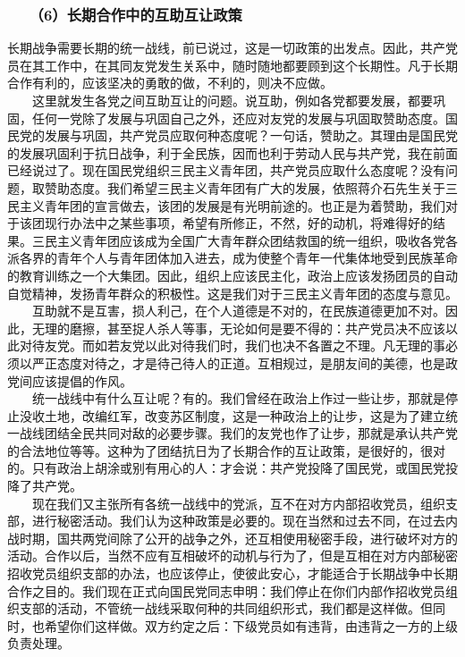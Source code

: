 \documentclass[cn,11pt,chinese]{elegantbook}
\def\myformat#1{\hfil\hfil #1}
\begin{document}
\subsubsection*{\myformat{　　（6）长期合作中的互助互让政策}}
长期战争需要长期的统一战线，前已说过，这是一切政策的出发点。因此，共产党员在其工作中，在其同友党发生关系中，随时随地都要顾到这个长期性。凡于长期合作有利的，应该坚决的勇敢的做，不利的，则决不应做。\\
　　这里就发生各党之间互助互让的问题。说互助，例如各党都要发展，都要巩固，任何一党除了发展与巩固自己之外，还应对友党的发展与巩固取赞助态度。国民党的发展与巩固，共产党员应取何种态度呢？一句话，赞助之。其理由是国民党的发展巩固利于抗日战争，利于全民族，因而也利于劳动人民与共产党，我在前面已经说过了。现在国民党组织三民主义青年团，共产党员应取什么态度呢？没有问题，取赞助态度。我们希望三民主义青年团有广大的发展，依照蒋介石先生关于三民主义青年团的宣言做去，该团的发展是有光明前途的。也正是为着赞助，我们对于该团现行办法中之某些事项，希望有所修正，不然，好的动机，将难得好的结果。三民主义青年团应该成为全国广大青年群众团结救国的统一组织，吸收各党各派各界的青年个人与青年团体加入进去，成为使整个青年一代集体地受到民族革命的教育训练之一个大集团。因此，组织上应该民主化，政治上应该发扬团员的自动自觉精神，发扬青年群众的积极性。这是我们对于三民主义青年团的态度与意见。\\
　　互助就不是互害，损人利己，在个人道德是不对的，在民族道德更加不对。因此，无理的磨擦，甚至捉人杀人等事，无论如何是要不得的：共产党员决不应该以此对待友党。而如若友党以此对待我们时，我们也决不各置之不理。凡无理的事必须以严正态度对待之，才是待己待人的正道。互相规过，是朋友间的美德，也是政党间应该提倡的作风。\\
　　统一战线中有什么互让呢？有的。我们曾经在政治上作过一些让步，那就是停止没收土地，改编红军，改变苏区制度，这是一种政治上的让步，这是为了建立统一战线团结全民共同对敌的必要步骤。我们的友党也作了让步，那就是承认共产党的合法地位等等。这种为了团结抗日为了长期合作的互让政策，是很好的，很对的。只有政治上胡涂或别有用心的人：才会说：共产党投降了国民党，或国民党投降了共产党。\\
　　现在我们又主张所有各统一战线中的党派，互不在对方内部招收党员，组织支部，进行秘密活动。我们认为这种政策是必要的。现在当然和过去不同，在过去内战时期，国共两党间除了公开的战争之外，还互相使用秘密手段，进行破坏对方的活动。合作以后，当然不应有互相破坏的动机与行为了，但是互相在对方内部秘密招收党员组织支部的办法，也应该停止，使彼此安心，才能适合于长期战争中长期合作之目的。我们现在正式向国民党同志申明：我们停止在你们内部作招收党员组织支部的活动，不管统一战线采取何种的共同组织形式，我们都是这样做。但同时，也希望你们这样做。双方约定之后：下级党员如有违背，由违背之一方的上级负责处理。\\
\end{document}
